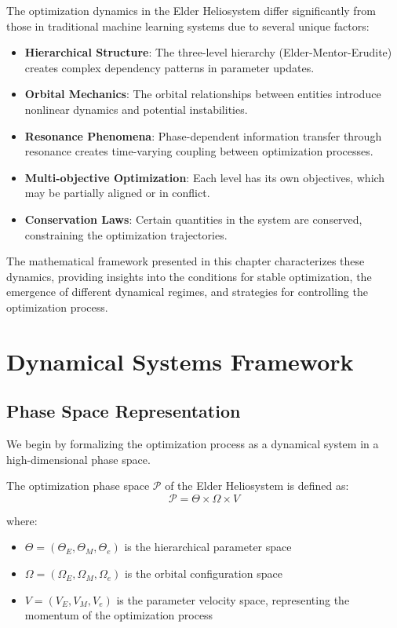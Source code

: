 The optimization dynamics in the Elder Heliosystem differ significantly from those in traditional machine learning systems due to several unique factors:

\begin{itemize}
    \item \textbf{Hierarchical Structure}: The three-level hierarchy (Elder-Mentor-Erudite) creates complex dependency patterns in parameter updates.
    \item \textbf{Orbital Mechanics}: The orbital relationships between entities introduce nonlinear dynamics and potential instabilities.
    \item \textbf{Resonance Phenomena}: Phase-dependent information transfer through resonance creates time-varying coupling between optimization processes.
    \item \textbf{Multi-objective Optimization}: Each level has its own objectives, which may be partially aligned or in conflict.
    \item \textbf{Conservation Laws}: Certain quantities in the system are conserved, constraining the optimization trajectories.
\end{itemize}

The mathematical framework presented in this chapter characterizes these dynamics, providing insights into the conditions for stable optimization, the emergence of different dynamical regimes, and strategies for controlling the optimization process.

\section{Dynamical Systems Framework}

\subsection{Phase Space Representation}

We begin by formalizing the optimization process as a dynamical system in a high-dimensional phase space.

\begin{definition}
The optimization phase space $\mathcal{P}$ of the Elder Heliosystem is defined as:
\begin{equation}
\mathcal{P} = \Theta \times \Omega \times V
\end{equation}

where:
\begin{itemize}
    \item $\Theta = (\Theta_E, \Theta_M, \Theta_e)$ is the hierarchical parameter space
    \item $\Omega = (\Omega_E, \Omega_M, \Omega_e)$ is the orbital configuration space
    \item $V = (V_E, V_M, V_e)$ is the parameter velocity space, representing the momentum of the optimization process
\end{itemize}
\end{definition}

